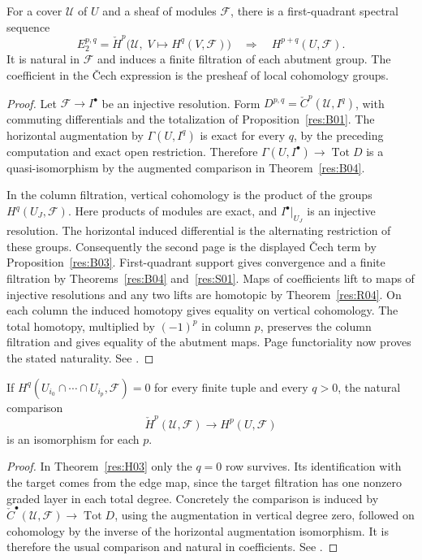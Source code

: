 \begin{theorem}\label{res:H03}
For a cover \(\mathcal U\) of \(U\) and a sheaf of modules \(\mathcal F\),
there is a first-quadrant spectral sequence
\[
 E_2^{p,q}=
 \check H^p\bigl(\mathcal U,\;V\longmapsto H^q(V,\mathcal F)\bigr)
 \quad\Longrightarrow\quad H^{p+q}(U,\mathcal F).
\]
It is natural in \(\mathcal F\) and induces a finite filtration of each
abutment group. The coefficient in the \v{C}ech expression is the
presheaf of local cohomology groups.
\end{theorem}
\begin{proof}
Let \(\mathcal F\to I^\bullet\) be an injective resolution. Form
\(D^{p,q}=\check C^p(\mathcal U,I^q)\), with commuting differentials
and the totalization of Proposition~\ref{res:B01}. The horizontal
augmentation by \(\Gamma(U,I^q)\) is exact for every \(q\), by the
preceding computation and exact open restriction. Therefore
\(\Gamma(U,I^\bullet)\to\operatorname{Tot}D\) is a quasi-isomorphism
by the augmented comparison in Theorem~\ref{res:B04}.

In the column filtration, vertical cohomology is the product of the
groups \(H^q(U_J,\mathcal F)\). Here products of modules are exact,
and \(I^\bullet|_{U_J}\) is an injective resolution. The horizontal
induced differential is the alternating restriction of these groups.
Consequently the second page is the displayed \v{C}ech term by
Proposition~\ref{res:B03}. First-quadrant support gives convergence and a
finite filtration by Theorems~\ref{res:B04} and~\ref{res:S01}.
Maps of coefficients lift to maps of injective resolutions and any
two lifts are homotopic by Theorem~\ref{res:R04}. On each column
the induced homotopy gives equality on vertical cohomology. The
total homotopy, multiplied by \((-1)^p\) in column \(p\), preserves
the column filtration and gives equality of the abutment maps.
Page functoriality now proves the stated naturality. See
\cite[Tags 01EP, 01ES]{stacks-sheaf}.
\end{proof}

\begin{corollary}
\label{res:H04}
If \(H^q(U_{i_0}\cap\cdots\cap U_{i_p},\mathcal F)=0\) for every
finite tuple and every \(q>0\), the natural comparison
\[
      \check H^p(\mathcal U,\mathcal F)\longrightarrow H^p(U,\mathcal F)
\]
is an isomorphism for each \(p\).
\end{corollary}
\begin{proof}
In Theorem~\ref{res:H03} only the \(q=0\) row survives. Its
identification with the target comes from the edge map, since the
target filtration has one nonzero graded layer in each total degree.
Concretely the comparison is induced by
\(\check C^\bullet(\mathcal U,\mathcal F)\to\operatorname{Tot}D\),
using the augmentation in vertical degree zero, followed on cohomology
by the inverse of the horizontal augmentation isomorphism.
It is therefore the usual comparison and natural in coefficients.
See \cite[Tag 01ET]{stacks-sheaf}.
\end{proof}

